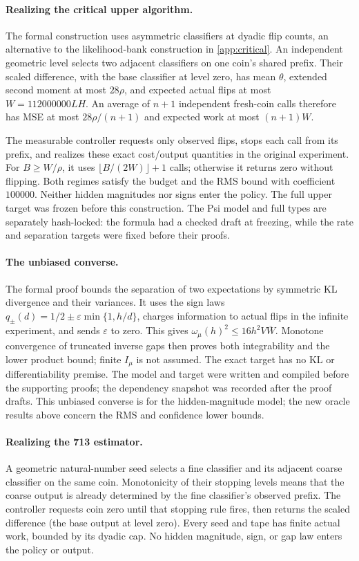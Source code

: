 \paragraph{Realizing the critical upper algorithm.}
The formal construction uses asymmetric classifiers at dyadic flip counts,
an alternative to the likelihood-bank construction in \cref{app:critical}.
An independent geometric level selects two adjacent classifiers on one
coin's shared prefix. Their scaled difference, with the base classifier
at level zero, has mean $\theta$, extended second moment at most $28\rho$,
and expected actual flips at most $W=112000000LH$.
An average of $n+1$ independent fresh-coin calls therefore has MSE at most
$28\rho/(n+1)$ and expected work at most $(n+1)W$.

The measurable controller requests only observed flips, stops each call
from its prefix, and realizes these exact cost/output quantities in the
original experiment. For $B\ge W/\rho$, it uses
$\lfloor B/(2W)\rfloor+1$ calls; otherwise it returns zero without flipping.
Both regimes satisfy the budget and the RMS bound with coefficient $100000$.
Neither hidden magnitudes nor signs enter the policy. The full upper target
was frozen before this construction. The Psi model and full types are
separately hash-locked: the formula had a checked draft at freezing, while
the rate and separation targets were fixed before their proofs.

\paragraph{The unbiased converse.}
The formal proof bounds the separation of two expectations by symmetric
KL divergence and their variances. It uses the sign laws
$q_\pm(d)=1/2\pm\varepsilon\min\{1,h/d\}$, charges information to actual
flips in the infinite experiment, and sends $\varepsilon$ to zero. This
gives $\omega_\mu(h)^2\le16h^2V\overline W$. Monotone convergence of
truncated inverse gaps then proves both integrability and the lower product
bound; finite $I_\mu$ is not assumed. The exact target has no KL or
differentiability premise. The model and target were written and compiled
before the supporting proofs; the dependency snapshot was recorded after
the proof drafts. This unbiased converse is for the hidden-magnitude model;
the new oracle results above concern the RMS and confidence lower bounds.

\paragraph{Realizing the 713 estimator.}
A geometric natural-number seed selects a fine classifier and its adjacent
coarse classifier on the same coin. Monotonicity of their stopping levels
means that the coarse output is already determined by the fine classifier's
observed prefix. The controller requests coin zero until that stopping rule
fires, then returns the scaled difference (the base output at level zero).
Every seed and tape has finite actual work, bounded by its dyadic cap.
No hidden magnitude, sign, or gap law enters the policy or output.

